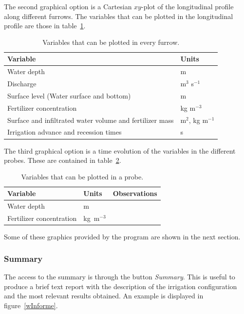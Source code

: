 \documentclass[review,authoryear]{elsarticle}
\begin{document}
The second graphical option is a Cartesian $xy$-plot of the longitudinal
profile along different furrows. 
The variables that can be plotted in the longitudinal profile are those in
table~\ref{tableVariables2}.

\begin{table}[h]\footnotesize
\caption{Variables that can be plotted in every furrow.}\label{tableVariables2}
\begin{center}
\begin{tabular}{ll}
\hline
Variable & Units\\
\hline
Water depth & m \\
Discharge & m$^3$ s$^{-1}$\\
Surface level (Water surface and bottom) & m\\
Fertilizer concentration & kg m$^{-3}$\\
Surface and infiltrated water volume and fertilizer mass & m$^2$, kg m$^{-1}$\\
Irrigation advance and recession times & s\\
\hline
\end{tabular}
\end{center}
\end{table}

The third graphical option is a time evolution of the variables in the different
probes. These are contained in table~\ref{tableVariables3}.
\begin{table}[!ht]\footnotesize
\caption{Variables that can be plotted in a probe.}\label{tableVariables3}
\begin{center}
\begin{tabular}{llr}
\hline
Variable & Units & Observations \\
\hline
Water depth & m\\
Fertilizer concentration & kg~m$^{-3}$\\
\hline
\end{tabular}
\end{center}
\end{table}

Some of these graphics provided by the program are shown in the next section.

\subsubsection{Summary}

The access to the summary is through the button \emph{Summary}. This is useful
to produce a brief text report with the description of the irrigation
configuration and the most relevant results obtained. An example is displayed in
figure~\ref{wInforme}.
\end{document}
